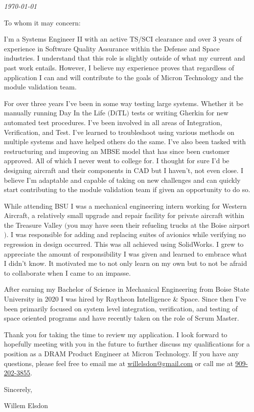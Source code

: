 \documentclass{ExpressiveCoverLetter}
\begin{document}
\coverletterheader[
    firstname=Willem,
    middleinitial=N,
    lastname=Elsdon,
    email=willelsdon@gmail.com,
    phone=909-202-3855,
    linkedin=willem-elsdon,
    github=welsdon,
    city=Boise,
    state=Idaho
]

\vspace{0.05in}
\emph{\today}
\vspace{0.15in}


To whom it may concern:

I'm a Systems Engineer II with an active TS/SCI clearance and over 3 years of experience in Software
Quality Assurance within the Defense and Space industries. I understand that this
role is slightly outside of what my current and past work entails. However, I
believe my experience proves that regardless of application I can and will contribute to
the goals of Micron Technology and the module validation team.

For over three years I've been in some way testing large systems.
Whether it be manually running Day In the Life $($DiTL$)$ tests or
writing Gherkin for new automated test procedures. I've been involved in
all areas of Integration, Verification, and Test. I've learned to
troubleshoot using various methods on multiple systems and have helped
others do the same. I've also been tasked with restructuring and
improving an MBSE model that has since been customer approved. All of which I never went to college for. I thought
for sure I'd be designing aircraft and their components in CAD but I
haven't, not even close. I believe I'm adaptable and capable of
taking on new challenges and can quickly start contributing to the
module validation team if given an opportunity to do so.

While attending BSU I was a mechanical engineering intern working for
Western Aircraft, a relatively small upgrade and repair facility for
private aircraft within the Treasure Valley $($you may have seen their
refueling trucks at the Boise airport$)$. I was responsible for
adding and replacing suites of avionics while verifying no regression in
design occurred. This was all achieved using SolidWorks. I grew to
appreciate the amount of responsibility I was given and learned to
embrace what I didn't know. It motivated me to not only learn on my own
but to not be afraid to collaborate when I came to an impasse.

After earning my Bachelor of Science in Mechanical Engineering from
Boise State University in 2020 I was hired by Raytheon Intelligence \&
Space. Since then I've been primarily focused
on system level integration, verification, and testing of space oriented programs
and have recently taken on the role of Scrum Master.

Thank you for taking the time to review my application. I look forward
to hopefully meeting with you in the future to further discuss my
qualifications for a position as a DRAM Product Engineer at Micron Technology.
If you have any questions, please feel free to
email me at \href{mailto:willelsdon@gmail.com}{willelsdon@gmail.com} or
call me at \href{tel:+1-909-202-3855}{909-202-3855}.

Sincerely,

\vspace{0.05in}

Willem Elsdon
\end{document}

